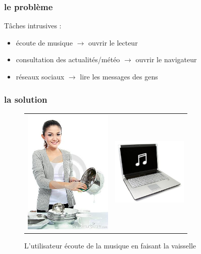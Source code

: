 \documentclass{beamer}
\begin{document}
\begin{frame}
	\frametitle{le problème}
	
	Tâches intrusives :
	
	\begin{itemize}
		\item écoute de musique $\rightarrow$ ouvrir le lecteur
		\item consultation des actualités/météo $\rightarrow$ ouvrir le navigateur
		\item réseaux sociaux $\rightarrow$ lire les messages des gens
	\end{itemize}
	
\end{frame}

\begin{frame}
	
	\frametitle{la solution}
	
	\begin{figure}
		\caption{L'utilisateur écoute de la musique en faisant la vaisselle}
		\begin{tabular}{cc}
		\includegraphics[height=6cm]{mains_mouillees} & \includegraphics[height=3.2cm]{laptop_music}
		\end{tabular}
	\end{figure}
	
\end{frame}
\end{document}
